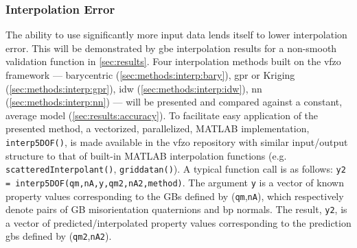 \documentclass[final,twocolumn,12pt]{elsarticle}
\newcommand{\outpt}{prediction}
\newcommand{\vfzorepo}{\gls{vfzo} repository}
\begin{document}

\subsubsection{Interpolation Error} \label{sec:intro:interp-error}
The ability to use significantly more input data lends itself to lower interpolation error. This will be demonstrated by \gls{gbe} interpolation results for a non-smooth validation function in \cref{sec:results}.
Four interpolation methods built on the \gls{vfzo} framework --- barycentric (\cref{sec:methods:interp:bary}), \gls{gpr} or Kriging (\cref{sec:methods:interp:gpr}), \gls{idw} (\cref{sec:methods:interp:idw}), \gls{nn} (\cref{sec:methods:interp:nn}) --- will be presented and compared against a constant, average model (\cref{sec:results:accuracy}). To facilitate easy application of the presented method, a vectorized, parallelized, MATLAB implementation, \texttt{interp5DOF()}, is made available in the \vfzorepo{} \cite{bairdFiveDegreeofFreedom5DOF2020} with similar input/output structure to that of built-in MATLAB interpolation functions (e.g. \texttt{scatteredInterpolant()}, \texttt{griddatan()}). A typical function call is as follows: \texttt{y2 = interp5DOF(qm,nA,y,qm2,nA2,method)}. The argument \texttt{y} is a vector of known property values corresponding to the GBs defined by (\texttt{qm},\texttt{nA}), which respectively denote pairs of GB misorientation quaternions and \gls{bp} normals. The result, \texttt{y2}, is a vector of predicted/interpolated property values corresponding to the \outpt{} \glspl{gb} defined by (\texttt{qm2},\texttt{nA2}). 
\end{document}
